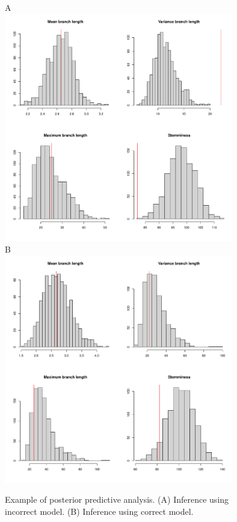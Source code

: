 \documentclass{article}
\begin{document}
\begin{figure}[p!]
\begin{center}
A\hspace*{10cm}~\\
\includegraphics[width=10cm]{examplePPCheck1.pdf}
\\B\hspace*{10cm}~\\
\includegraphics[width=10cm]{examplePPCheck2.pdf}
\end{center}
\caption{Example of posterior predictive analysis.
(A) Inference using incorrect model. 
(B) Inference using correct model.
\label{fig:ppCheck}}
\end{figure}
\end{document}

